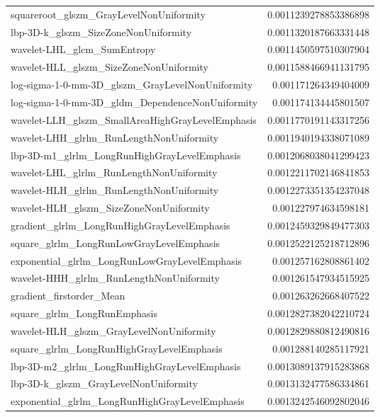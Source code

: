 {\begin{xltabular}[H]{\textwidth}{X r}
        squareroot\_glszm\_GrayLevelNonUniformity & 0.0011239278853386898 \\
        lbp-3D-k\_glszm\_SizeZoneNonUniformity & 0.0011320187663331448 \\
        wavelet-LHL\_glcm\_SumEntropy & 0.0011450597510307904 \\
        wavelet-HLL\_glszm\_SizeZoneNonUniformity & 0.0011588466941131795 \\
        log-sigma-1-0-mm-3D\_glszm\_GrayLevelNonUniformity & 0.001171264349404009 \\
        log-sigma-1-0-mm-3D\_gldm\_DependenceNonUniformity & 0.001174134445801507 \\
        wavelet-LLH\_glszm\_SmallAreaHighGrayLevelEmphasis & 0.0011770191143317256 \\
        wavelet-LHH\_glrlm\_RunLengthNonUniformity & 0.0011940194338071089 \\
        lbp-3D-m1\_glrlm\_LongRunHighGrayLevelEmphasis & 0.0012068038041299423 \\
        wavelet-LHL\_glrlm\_RunLengthNonUniformity & 0.0012211702146841853 \\
        wavelet-HLH\_glrlm\_RunLengthNonUniformity & 0.0012273351354237048 \\
        wavelet-HLH\_glszm\_SizeZoneNonUniformity & 0.001227974634598181 \\
        gradient\_glrlm\_LongRunHighGrayLevelEmphasis & 0.0012459329849477303 \\
        square\_glrlm\_LongRunLowGrayLevelEmphasis & 0.0012522125218712896 \\
        exponential\_glrlm\_LongRunLowGrayLevelEmphasis & 0.001257162808861402 \\
        wavelet-HHH\_glrlm\_RunLengthNonUniformity & 0.001261547934515925 \\
        gradient\_firstorder\_Mean & 0.001263262668407522 \\
        square\_glrlm\_LongRunEmphasis & 0.0012827382042210724 \\
        wavelet-HLH\_glszm\_GrayLevelNonUniformity & 0.0012829880812490816 \\
        square\_glrlm\_LongRunHighGrayLevelEmphasis & 0.001288140285117921 \\
        lbp-3D-m2\_glrlm\_LongRunHighGrayLevelEmphasis & 0.0013089137915283868 \\
        lbp-3D-k\_glszm\_GrayLevelNonUniformity & 0.0013132477586334861 \\
        exponential\_glrlm\_LongRunHighGrayLevelEmphasis & 0.0013242546092802046 \\

\end{xltabular}}
